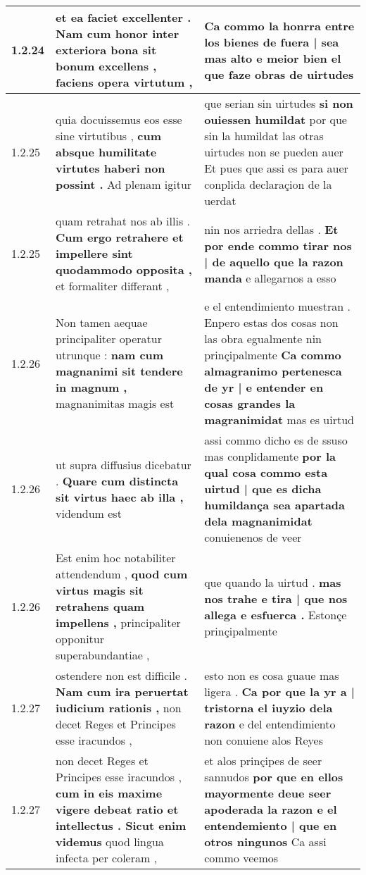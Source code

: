 \begin{tabular}{|p{1cm}|p{6.5cm}|p{6.5cm}|}
1.2.24 & et ea faciet excellenter . \textbf{ Nam cum honor inter exteriora bona sit bonum excellens , } faciens opera virtutum , & Ca commo la honrra \textbf{ entre los bienes de fuera | sea mas alto e meior bien } el que faze obras de uirtudes \\\hline
1.2.25 & quia docuissemus eos esse sine virtutibus , \textbf{ cum absque humilitate virtutes haberi non possint . } Ad plenam igitur & que serian sin uirtudes \textbf{ si non ouiessen humildat } por que sin la humildat las otras uirtudes non se pueden auer Et pues que assi es para auer conplida declaraçion de la uerdat \\\hline
1.2.25 & quam retrahat nos ab illis . \textbf{ Cum ergo retrahere et impellere sint quodammodo opposita , } et formaliter differant , & nin nos arriedra dellas . \textbf{ Et por ende commo tirar nos | de aquello que la razon manda } e allegarnos a esso \\\hline
1.2.26 & Non tamen aequae principaliter operatur utrunque : \textbf{ nam cum magnanimi sit tendere in magnum , } magnanimitas magis est & e el entendimiento muestran . Enpero estas dos cosas non las obra egualmente nin prinçipalmente \textbf{ Ca commo almagranimo pertenesca de yr | e entender en cosas grandes la magranimidat } mas es uirtud \\\hline
1.2.26 & ut supra diffusius dicebatur . \textbf{ Quare cum distincta sit virtus haec ab illa , } videndum est & assi commo dicho es de ssuso mas conplidamente \textbf{ por la qual cosa commo esta uirtud | que es dicha humildança sea apartada dela magnanimidat } conuienenos de veer \\\hline
1.2.26 & Est enim hoc notabiliter attendendum , \textbf{ quod cum virtus magis sit retrahens quam impellens , } principaliter opponitur superabundantiae , & que quando la uirtud . \textbf{ mas nos trahe e tira | que nos allega e esfuerca . } Estonçe prinçipalmente \\\hline
1.2.27 & ostendere non est difficile . \textbf{ Nam cum ira peruertat iudicium rationis , } non decet Reges et Principes esse iracundos , & esto non es cosa guaue mas ligera . \textbf{ Ca por que la yr a | tristorna el iuyzio dela razon } e del entendimiento non conuiene alos Reyes \\\hline
1.2.27 & non decet Reges et Principes esse iracundos , \textbf{ cum in eis maxime vigere debeat ratio et intellectus . Sicut enim videmus } quod lingua infecta per coleram , & et alos prinçipes de seer sannudos \textbf{ por que en ellos mayormente deue seer apoderada la razon e el entendemiento | que en otros ningunos } Ca assi commo veemos \\\hline

\end{tabular}

